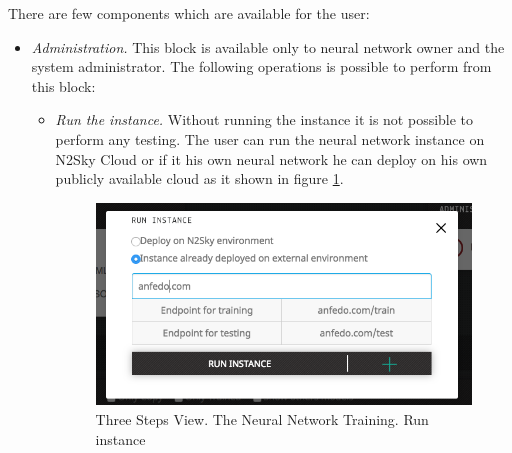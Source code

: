 There are few components which are available for the user:
\begin{itemize}
\item \emph{Administration.} This block is available only to neural network owner and the system administrator. The following operations is possible to perform from this block:
\begin{itemize}
\item \emph{Run the instance.} Without running the instance it is not possible to perform any testing. The user can run the neural network instance on N2Sky Cloud or if it his own neural network he can deploy on his own publicly available cloud as it shown in figure \ref{fig:run_instance_3_steps}. 

\begin{figure}[htbp]
\begin{center}
  \includegraphics[scale=0.5]{components/5/img/run_instance_3_steps.png}
  \caption{Three Steps View. The Neural Network Training. Run instance}
  \label{fig:run_instance_3_steps}
\end{center}
\end{figure}


\end{itemize}
\end{itemize}
